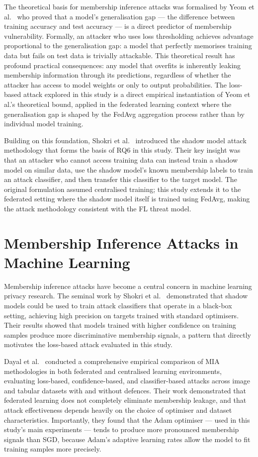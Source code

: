 \documentclass[12pt, a4paper]{report}
\begin{document}
The theoretical basis for membership inference attacks was formalised by Yeom
et al.~\cite{yeom2018} who proved that a model's generalisation gap --- the
difference between training accuracy and test accuracy --- is a direct predictor
of membership vulnerability. Formally, an attacker who uses loss thresholding
achieves advantage proportional to the generalisation gap: a model that perfectly
memorises training data but fails on test data is trivially attackable. This
theoretical result has profound practical consequences: any model that
overfits is inherently leaking membership information through its predictions,
regardless of whether the attacker has access to model weights or only to output
probabilities. The loss-based attack explored in this study is a direct empirical
instantiation of Yeom et al.'s theoretical bound, applied in the federated
learning context where the generalisation gap is shaped by the FedAvg aggregation
process rather than by individual model training.

Building on this foundation, Shokri et al.~\cite{shokri2017} introduced the
shadow model attack methodology that forms the basis of RQ6 in this study.
Their key insight was that an attacker who cannot access training data can instead
train a shadow model on similar data, use the shadow model's known membership
labels to train an attack classifier, and then transfer this classifier to the
target model. The original formulation assumed centralised training; this study
extends it to the federated setting where the shadow model itself is trained
using FedAvg, making the attack methodology consistent with the FL threat model.

\section{Membership Inference Attacks in Machine Learning}

Membership inference attacks have become a central concern in machine learning
privacy research. The seminal work by Shokri et al.~\cite{shokri2017} demonstrated
that shadow models could be used to train attack classifiers that operate in a
black-box setting, achieving high precision on targets trained with standard
optimisers. Their results showed that models trained with higher confidence on
training samples produce more discriminative membership signals, a pattern that
directly motivates the loss-based attack evaluated in this study.

Dayal et al.~\cite{dayal2023} conducted a comprehensive empirical comparison of
MIA methodologies in both federated and centralised learning environments,
evaluating loss-based, confidence-based, and classifier-based attacks across
image and tabular datasets with and without defences. Their work demonstrated
that federated learning does not completely eliminate membership leakage, and
that attack effectiveness depends heavily on the choice of optimiser and dataset
characteristics. Importantly, they found that the Adam optimiser --- used in this
study's main experiments --- tends to produce more pronounced membership signals
than SGD, because Adam's adaptive learning rates allow the model to fit training
samples more precisely.
\end{document}
